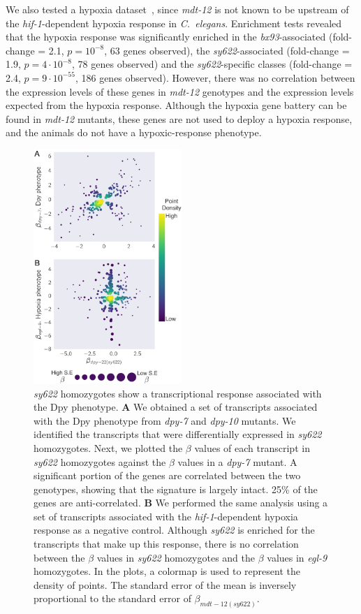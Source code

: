 \documentclass[10pt, twocolumn]{article}
\newcommand{\cel}{\emph{C.~elegans}}
\newcommand{\gene}[1]{\mbox{\emph{#1}}}
\newcommand{\dpy}{\gene{mdt-12}}
\begin{document}
We also tested a hypoxia dataset~\cite{AngelesAlboresHIF}, since \emph{mdt-12}
is not known to be upstream of the \gene{hif-1}-dependent hypoxia response
in \cel{}. Enrichment tests revealed that the hypoxia response was significantly
enriched in the \emph{bx93}-associated (fold-change = 2.1, $p=10^{-8}$, 63 genes
observed), the \emph{sy622}-associated (fold-change = 1.9, $p=4\cdot10^{-8}$, 78
genes observed) and the \emph{sy622}-specific classes (fold-change = 2.4,
$p=9\cdot10^{-55}$, 186 genes observed). However, there was no correlation
between the expression levels of these genes in \dpy{} genotypes and the
expression levels expected from the hypoxia response. Although the hypoxia gene
battery can be found in \dpy{} mutants, these genes are not used to deploy a
hypoxia response, and the animals do not have a hypoxic-response phenotype.

\begin{figure}
  \centering{}
  \includegraphics[width=0.5\textwidth]{../figs/dpy_phenotype.pdf}
  \caption{
    \emph{sy622} homozygotes show a transcriptional response associated with the
    Dpy phenotype. \textbf{A} We obtained a set of transcripts associated with
    the Dpy phenotype from \gene{dpy-7} and \gene{dpy-10} mutants. We identified
    the transcripts that were differentially expressed in \emph{sy622}
    homozygotes. Next, we plotted the $\beta$ values of each transcript in
    \emph{sy622} homozygotes against the $\beta$ values in a \emph{dpy-7}
    mutant. A significant portion of the genes are correlated between the two
    genotypes, showing that the signature is largely intact. 25\% of the genes
    are anti-correlated. \textbf{B} We performed the same analysis using a set
    of transcripts associated with the \gene{hif-1}-dependent hypoxia response
    as a negative control. Although \emph{sy622} is enriched for the transcripts
    that make up this response, there is no correlation between the $\beta$
    values in \emph{sy622} homozygotes and the  $\beta$ values in \emph{egl-9}
    homozygotes. In the plots, a colormap is used to represent the density of
    points. The standard error of the mean is inversely proportional to the
    standard error of $\beta_{mdt-12(sy622)}$.
    }
\label{fig:dpy_phenotype}
\end{figure}
\end{document}
